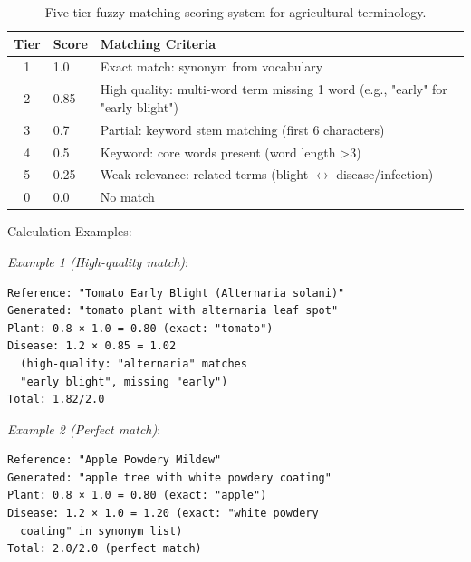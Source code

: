 \documentclass[11pt]{article}
\begin{document}
\begin{table}[h!]
\centering
\small
\setlength{\tabcolsep}{3pt}
\begin{tabular}{clp{5cm}}
\hline
\textbf{Tier} & \textbf{Score} & \textbf{Matching Criteria} \\
\hline
1 & 1.0 & Exact match: synonym from vocabulary \\
2 & 0.85 & High quality: multi-word term missing 1 word (e.g., "early" for "early blight") \\
3 & 0.7 & Partial: keyword stem matching (first 6 characters) \\
4 & 0.5 & Keyword: core words present (word length >3) \\
5 & 0.25 & Weak relevance: related terms (blight $\leftrightarrow$ disease/infection) \\
 $0$ & $0.0$ & No match \\
\hline
\end{tabular}
\caption{Five-tier fuzzy matching scoring system for agricultural terminology.}
\label{tab:fuzzy_matching}
\end{table}

\noindent Calculation Examples:

\vspace{2pt}
\noindent\textit{Example 1 (High-quality match)}:

\vspace{1pt}
\begin{footnotesize}
\begin{verbatim}
Reference: "Tomato Early Blight (Alternaria solani)"
Generated: "tomato plant with alternaria leaf spot"
Plant: 0.8 × 1.0 = 0.80 (exact: "tomato")
Disease: 1.2 × 0.85 = 1.02
  (high-quality: "alternaria" matches
  "early blight", missing "early")
Total: 1.82/2.0
\end{verbatim}
\end{footnotesize}
\vspace{2pt}

\noindent\textit{Example 2 (Perfect match)}:

\vspace{1pt}
\begin{footnotesize}
\begin{verbatim}
Reference: "Apple Powdery Mildew"
Generated: "apple tree with white powdery coating"
Plant: 0.8 × 1.0 = 0.80 (exact: "apple")
Disease: 1.2 × 1.0 = 1.20 (exact: "white powdery
  coating" in synonym list)
Total: 2.0/2.0 (perfect match)
\end{verbatim}
\end{footnotesize}
\vspace{2pt}
\end{document}
